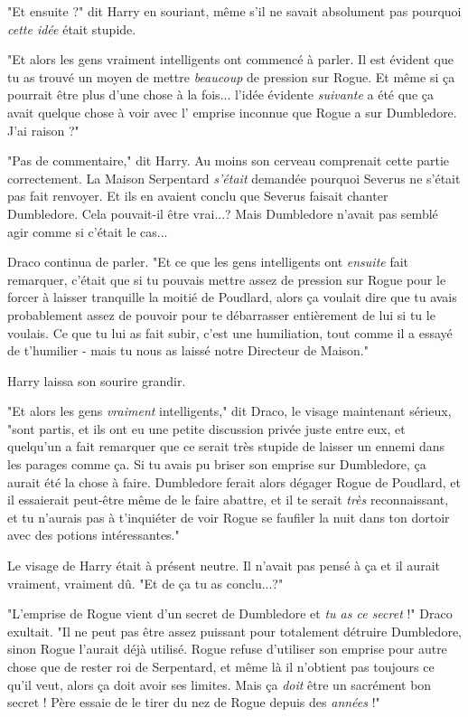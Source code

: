 "Et ensuite ?" dit Harry en souriant, même s'il ne savait absolument pas pourquoi \emph{cette idée}  était stupide.

"Et alors les gens vraiment intelligents ont commencé à parler. Il est évident que tu as trouvé un moyen de mettre \emph{beaucoup } de pression sur Rogue. Et même si ça pourrait être plus d'une chose à la fois... l'idée évidente \emph{suivante}  a été que ça avait quelque chose à voir avec l' emprise inconnue que Rogue a sur Dumbledore. J'ai raison ?"

"Pas de commentaire," dit Harry. Au moins son cerveau comprenait cette partie correctement. La Maison Serpentard \emph{s'était}  demandée pourquoi Severus ne s'était pas fait renvoyer. Et ils en avaient conclu que Severus faisait chanter Dumbledore. Cela pouvait-il être vrai...? Mais Dumbledore n'avait pas semblé agir comme si c'était le cas...

Draco continua de parler. "Et ce que les gens intelligents ont \emph{ensuite}  fait remarquer, c'était que si tu pouvais mettre assez de pression sur Rogue pour le forcer à laisser tranquille la moitié de Poudlard, alors ça voulait dire que tu avais probablement assez de pouvoir pour te débarrasser entièrement de lui si tu le voulais. Ce que tu lui as fait subir, c'est une humiliation, tout comme il a essayé de t'humilier - mais tu nous as laissé notre Directeur de Maison."

Harry laissa son sourire grandir.

"Et alors les gens \emph{vraiment}  intelligents," dit Draco, le visage maintenant sérieux, "sont partis, et ils ont eu une petite discussion privée juste entre eux, et quelqu'un a fait remarquer que ce serait très stupide de laisser un ennemi dans les parages comme ça. Si tu avais pu briser son emprise sur Dumbledore, ça aurait été la chose à faire. Dumbledore ferait alors dégager Rogue de Poudlard, et il essaierait peut-être même de le faire abattre, et il te serait \emph{très}  reconnaissant, et tu n'aurais pas à t'inquiéter de voir Rogue se faufiler la nuit dans ton dortoir avec des potions intéressantes."

Le visage de Harry était à présent neutre. Il n'avait pas pensé à ça et il aurait vraiment, vraiment dû. "Et de ça tu as conclu...?"

"L'emprise de Rogue vient d'un secret de Dumbledore et \emph{tu as ce secret}  !" Draco exultait. "Il ne peut pas être assez puissant pour totalement détruire Dumbledore, sinon Rogue l'aurait déjà utilisé. Rogue refuse d'utiliser son emprise pour autre chose que de rester roi de Serpentard, et même là il n'obtient pas toujours ce qu'il veut, alors ça doit avoir ses limites. Mais ça \emph{doit } être un sacrément bon secret ! Père essaie de le tirer du nez de Rogue depuis des \emph{années}  !"

